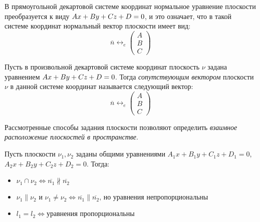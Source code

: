 \begin{note}
	В прямоугольной декартовой системе координат нормальное уравнение плоскости преобразуется к виду $Ax+By+Cz\hm{+}D=0$, и это означает, что в такой системе координат нормальный вектор плоскости имеет вид:
	\[\overline{n} \leftrightarrow_{e} \begin{pmatrix}A\\B\\C\end{pmatrix}\]
\end{note}

\begin{definition}
	Пусть в произвольной декартовой системе координат плоскость $\nu$ задана уравнением $Ax+By+Cz\hm{+}D=0$. Тогда \textit{сопутствующим вектором} плоскости $\nu$ в данной системе координат называется следующий вектор:
	\[\overline{n} \leftrightarrow_{e} \begin{pmatrix}A\\B\\C\end{pmatrix}\]
\end{definition}

Рассмотренные способы задания плоскости позволяют определить \textit{взаимное расположение плоскостей в пространстве}.

\begin{proposition}
	Пусть плоскости $\nu_1, \nu_2$ заданы общими уравнениями $A_1x+B_1y+C_1z+D_1 = 0$, $A_2x+B_2y+C_2z+D_2 = 0$. Тогда:
	\begin{itemize}
		\item $\nu_1 \cap \nu_2 \Leftrightarrow \overline{n_1} \nparallel \overline{n_2}$
		\item $\nu_1 \parallel \nu_2 \text{ и } \nu_1 \ne \nu_2 \Leftrightarrow \overline{n_1} \parallel \overline{n_2} \text{, но уравнения непропорциональны}$
		\item $l_1 = l_2 \Leftrightarrow  \text{уравнения пропорциональны}$
	\end{itemize}
\end{proposition}

